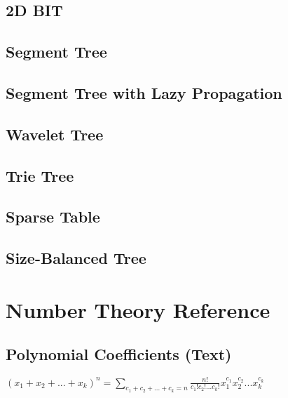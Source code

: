 \documentclass[10pt]{extarticle}
\begin{document}
\begin{multicols*}{3}
\subsection{2D BIT}


\subsection{Segment Tree} %


\subsection{Segment Tree with Lazy Propagation} %


\subsection{Wavelet Tree} %


\subsection{Trie Tree} %


\subsection{Sparse Table}


\subsection{Size-Balanced Tree}


\section{Number Theory Reference}
\subsection{Polynomial Coefficients (Text)} %
$(x_1 + x_2 + ... + x_k)^n = \sum_{c_1 + c_2 + ... + c_k = n}
\frac{n!}{c_1! c_2! ... c_k!} x_1^{c_1} x_2^{c_2} ... x_k^{c_k}$


\end{multicols*}
\end{document}
